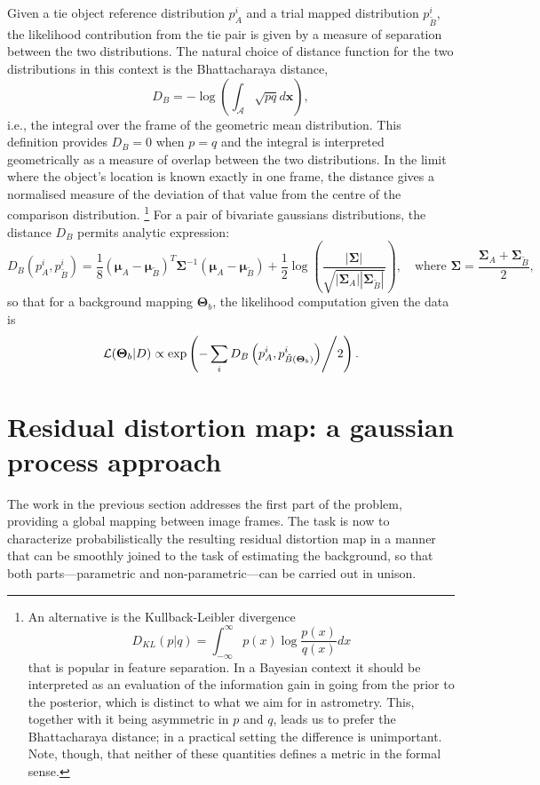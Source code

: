 \documentclass[manuscript]{aastex}
\newcommand{\bsmu}{\boldsymbol\mu}
\newcommand{\bsS}{\boldsymbol\Sigma}
\newcommand{\bsT}{\boldsymbol\Theta}
\begin{document}
Given a tie object reference distribution $p^i_A$ and a trial mapped distribution $p^i_{\tilde{B}}$, the likelihood contribution from the tie pair is given by a measure of separation between the two distributions. The natural choice of distance function for the two distributions in this context is the Bhattacharaya distance,
\begin{equation}
 D_B = -\log\left( \int_\mathcal{A}\sqrt{p q}d\mathbf{x}\right),
 \end{equation}
i.e., the integral over the frame of the geometric mean distribution. This definition provides $D_B=0$ when $p = q$ and the integral is interpreted geometrically as a measure of overlap between the two distributions. In the limit where the object's location is known exactly in one frame, the distance gives a normalised measure of the deviation of that value from the centre of the comparison distribution. \footnote{An alternative is the Kullback-Leibler divergence \[D_{KL}(p|q) = \int_{-\infty}^{\infty} p(x) \log\frac{p(x)}{q(x)} dx \] that is popular in feature separation. In a Bayesian context it should be interpreted as an evaluation of the information gain in going from the prior to the posterior, which is distinct to what we aim for in astrometry. This, together with it being asymmetric in $p$ and $q$, leads us to prefer the Bhattacharaya distance; in a practical setting the difference is unimportant. Note, though, that neither of these quantities defines a metric in the formal sense.}
For a pair of bivariate gaussians distributions, the distance $D_B$ permits analytic expression:
\begin{equation}
D_B(p^i_A,p^i_{\tilde{B}}) = \frac{1}{8}(\bsmu_A-\bsmu_{\tilde{B}})^T\bsS^{-1}(\bsmu_A-\bsmu_{\tilde{B}}) + \frac{1}{2}\log\left(\frac{|\bsS|}{\sqrt{|\bsS_A||\bsS_{\tilde{B}}|}}\right),\quad\textrm{where }\bsS = \frac{\bsS_A+\bsS_{\tilde{B}}}{2},
\end{equation}
so that for a background mapping $\bsT_b$, the likelihood computation given the data is
\begin{equation} \mathcal{L}(\bsT_b|D) \propto \exp\left(-\sum_i D_B\left(p^i_A,p^i_{\tilde{B}(\bsT_b)}\right)\middle/2\right).\label{eq:background_likelihood}
\end{equation}

\section{Residual distortion map: a gaussian process approach}\label{sec:gp}
The work in the previous section addresses the first part of the problem, providing a global mapping between image frames. The task is now to characterize probabilistically the resulting residual distortion map in a manner that can be smoothly joined to the task of estimating the background, so that both parts---parametric and non-parametric---can be carried out in unison. 
\end{document}
